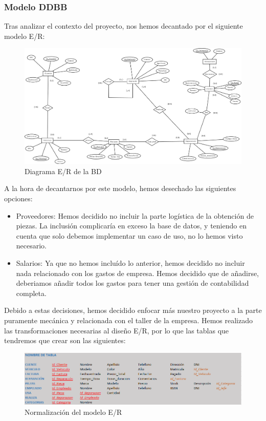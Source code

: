 \documentclass{article}
\begin{document}
\subsubsection{Modelo DDBB}
Tras analizar el contexto del proyecto, nos hemos decantado por el siguiente modelo E/R: 
\begin{figure}[H]
  \centering
  \includegraphics[width=1.0\textwidth]{bbdd/DiagramaEntidadRelacion.png}
  \caption{Diagrama E/R de la BD}
  \label{fig:ER}
\end{figure}
A la hora de decantarnos por este modelo, hemos desechado las siguientes opciones:\\
\begin{itemize}
  \item Proveedores: Hemos decidido no incluir la parte logística de la obtención de piezas. La inclusión complicaría en exceso la base de datos, y teniendo en cuenta que solo debemos implementar un caso de uso, no lo hemos visto necesario.
  \item Salarios: Ya que no hemos incluído lo anterior, hemos decidido no incluir nada relacionado con los gastos de empresa. Hemos decidido que de añadirse, deberiamos añadir todos los gastos para tener una gestión de contabilidad completa.
\end{itemize}
Debido a estas decisiones, hemos decidido enfocar más nuestro proyecto a la parte puramente mecánica y relacionada con el taller de la empresa. Hemos realizado las transformaciones necesarias al diseño E/R, por lo que las 
tablas que tendremos que crear son las siguientes:
\begin{figure}[H]
  \centering
  \includegraphics[width=1.0\textwidth]{bbdd/normalizacion.PNG}
  \caption{Normalización del modelo E/R}
  \label{fig:normalizado}
\end{figure}
\end{document}
